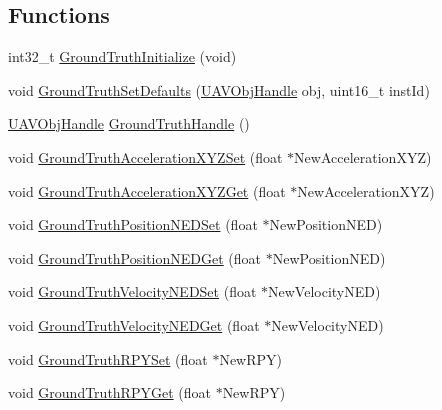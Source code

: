 \subsection*{\-Functions}
\begin{DoxyCompactItemize}
\item 
int32\-\_\-t \hyperlink{group___ground_truth_gab6843601c595fb0a17594904200415e1}{\-Ground\-Truth\-Initialize} (void)
\item 
void \hyperlink{group___ground_truth_gadeb12516c651cb993ed1c3662b3d7133}{\-Ground\-Truth\-Set\-Defaults} (\hyperlink{targets_2_u_a_v_objects_2inc_2uavobjectmanager_8h_a279053e22be53ce9f895043aaeb91e3b}{\-U\-A\-V\-Obj\-Handle} obj, uint16\-\_\-t inst\-Id)
\item 
\hyperlink{targets_2_u_a_v_objects_2inc_2uavobjectmanager_8h_a279053e22be53ce9f895043aaeb91e3b}{\-U\-A\-V\-Obj\-Handle} \hyperlink{group___ground_truth_ga5aabd19c6c455feb5b45d6b3be7384c4}{\-Ground\-Truth\-Handle} ()
\item 
void \hyperlink{group___ground_truth_ga5248aaf44f131ae0ecf0600daab7cc71}{\-Ground\-Truth\-Acceleration\-X\-Y\-Z\-Set} (float $\ast$\-New\-Acceleration\-X\-Y\-Z)
\item 
void \hyperlink{group___ground_truth_ga84d6508a10a7acdc57f7432dfe5e7e48}{\-Ground\-Truth\-Acceleration\-X\-Y\-Z\-Get} (float $\ast$\-New\-Acceleration\-X\-Y\-Z)
\item 
void \hyperlink{group___ground_truth_ga47181bc08864761a1061218491bafe1b}{\-Ground\-Truth\-Position\-N\-E\-D\-Set} (float $\ast$\-New\-Position\-N\-E\-D)
\item 
void \hyperlink{group___ground_truth_gae833fa5e7f0a8c3862a5cab6b6b5ea4c}{\-Ground\-Truth\-Position\-N\-E\-D\-Get} (float $\ast$\-New\-Position\-N\-E\-D)
\item 
void \hyperlink{group___ground_truth_gaf87415b1d0e75ac3e3cc921b0e255c3b}{\-Ground\-Truth\-Velocity\-N\-E\-D\-Set} (float $\ast$\-New\-Velocity\-N\-E\-D)
\item 
void \hyperlink{group___ground_truth_ga9575f6bf34f6b70811d2abe89dfc056d}{\-Ground\-Truth\-Velocity\-N\-E\-D\-Get} (float $\ast$\-New\-Velocity\-N\-E\-D)
\item 
void \hyperlink{group___ground_truth_gacd1bedbd997a5a1ffd24ed0bcaa00cef}{\-Ground\-Truth\-R\-P\-Y\-Set} (float $\ast$\-New\-R\-P\-Y)
\item 
void \hyperlink{group___ground_truth_gabf8dcbc0b29494e431e183a2384e69e3}{\-Ground\-Truth\-R\-P\-Y\-Get} (float $\ast$\-New\-R\-P\-Y)
\item 

\end{DoxyCompactItemize}
